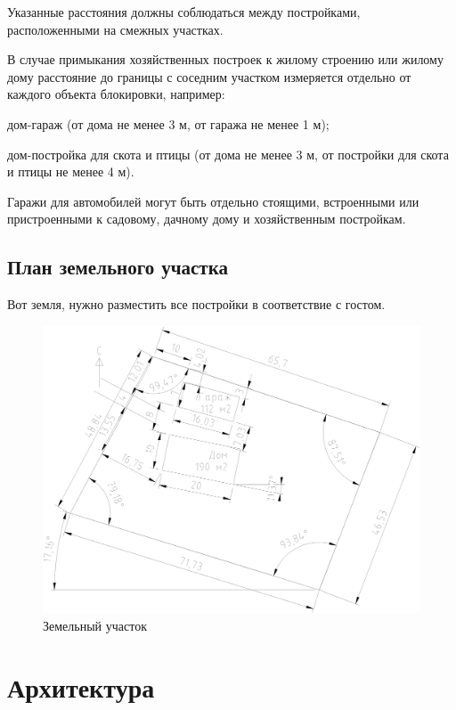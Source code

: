 \documentclass[10pt, twocolumn]{report}
\newenvironment{itemize*}%
{\begin{itemize}%
	\setlength{\itemsep}{1pt}%
	\setlength{\parskip}{1pt}}%
{\end{itemize}}
\begin{document}
Указанные расстояния должны соблюдаться между постройками, расположенными на смежных участках.

В случае примыкания хозяйственных построек к жилому строению или жилому дому расстояние до границы с соседним участком измеряется отдельно от каждого объекта блокировки, например:

\begin{itemize*}
	\item дом-гараж (от дома не менее 3 м, от гаража не менее 1 м);
	\item дом-постройка для скота и птицы (от дома не менее 3 м, от постройки для скота и птицы не менее 4 м).
\end{itemize*}

Гаражи для автомобилей могут быть отдельно стоящими, встроенными или пристроенными к садовому, дачному дому и хозяйственным постройкам.

\chapter{План земельного участка}
Вот земля, нужно разместить все постройки в соответствие с гостом.	

\begin{figure}[h]
	\centering
	\includegraphics[height=0.85\textheight]{img/area.png}
	\caption{Земельный участок}
	\label{fig:area}
\end{figure}


\part{Архитектура}
\end{document}
